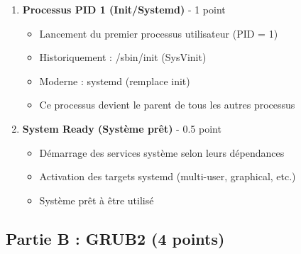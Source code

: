 \documentclass[12pt,a4paper]{article}
\begin{document}
\begin{answerbox}
\begin{enumerate}
    \item \textbf{Processus PID 1 (Init/Systemd)} - 1 point
    \begin{itemize}
        \item Lancement du premier processus utilisateur (PID = 1)
        \item Historiquement : /sbin/init (SysVinit)
        \item Moderne : systemd (remplace init)
        \item Ce processus devient le parent de tous les autres processus
    \end{itemize}
    
    \item \textbf{System Ready (Système prêt)} - 0.5 point
    \begin{itemize}
        \item Démarrage des services système selon leurs dépendances
        \item Activation des targets systemd (multi-user, graphical, etc.)
        \item Système prêt à être utilisé
    \end{itemize}
\end{enumerate}
\end{answerbox}

\subsection*{Partie B : GRUB2 (4 points)}
\end{document}
